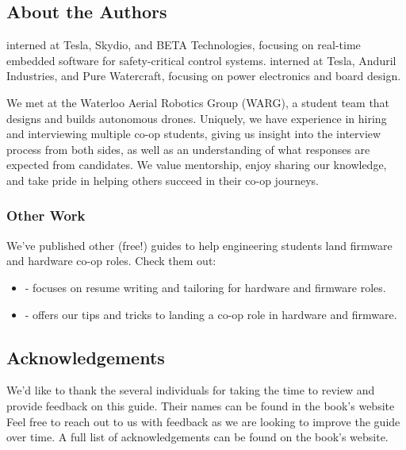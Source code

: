 \documentclass[main.tex]{subfiles}
\begin{document}
\subsection{About the Authors}
 interned at Tesla, Skydio, and BETA Technologies, focusing on real-time embedded software for safety-critical control systems.
\newline
\newline
{} interned at Tesla, Anduril Industries, and Pure Watercraft, focusing on power electronics and board design. \newline

\newnoindentpara We met at the Waterloo Aerial Robotics Group (WARG), a student team that designs and builds autonomous drones. Uniquely, we have experience in hiring and interviewing multiple co-op students, giving us insight into the interview process from both sides, as well as an understanding of what responses are expected from candidates. We value mentorship, enjoy sharing our knowledge, and take pride in helping others succeed in their co-op journeys.

\subsubsection{Other Work}
We've published other (free!) guides to help engineering students land firmware and hardware co-op roles. Check them out:
\begin{itemize}
    \item {} - focuses on resume writing and tailoring for hardware and firmware roles.
    \item {} - offers our tips and tricks to landing a co-op role in hardware and firmware.
\end{itemize}

\subsection{Acknowledgements}
We'd like to thank the several individuals for taking the time to review and provide feedback on this guide. Their names can be found in the book's website  Feel free to reach out to us with feedback as we are looking to improve the guide over time. A full list of acknowledgements can be found on the book's website.
\end{document}
